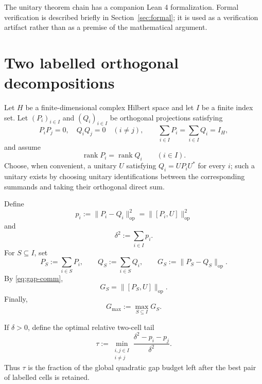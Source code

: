 \documentclass[11pt]{article}
\newcommand{\op}{\mathrm{op}}
\newcommand{\gmax}{G_{\max}}
\newcommand{\dd}{\delta}
\begin{document}
The unitary theorem chain has a companion Lean 4 formalization.  Formal
verification is described briefly in Section~\ref{sec:formal}; it is used as
a verification artifact rather than as a premise of the mathematical
argument.


\section{Two labelled orthogonal decompositions}\label{sec:setup}

Let $H$ be a finite-dimensional complex Hilbert space and let $I$ be a finite
index set.  Let $(P_i)_{i\in I}$ and $(Q_i)_{i\in I}$ be orthogonal
projections satisfying
\begin{equation}\label{eq:decomp}
  P_iP_j=0,\quad Q_iQ_j=0\quad(i\ne j),
  \qquad
  \sum_{i\in I}P_i=\sum_{i\in I}Q_i=I_H,
\end{equation}
and assume
\[
  \operatorname{rank}P_i=\operatorname{rank}Q_i
  \qquad(i\in I).
\]
Choose, when convenient, a unitary $U$ satisfying $Q_i=UP_iU^*$ for every
$i$; such a unitary exists by choosing unitary identifications between the
corresponding summands and taking their orthogonal direct sum.

Define
\begin{equation}\label{eq:pi}
  p_i:=\|P_i-Q_i\|_{\op}^2
      =\|[P_i,U]\|_{\op}^2
\end{equation}
and
\begin{equation}\label{eq:delta}
  \dd^2:=\sum_{i\in I}p_i.
\end{equation}
For $S\subseteq I$, set
\begin{equation}\label{eq:cut}
  P_S:=\sum_{i\in S}P_i,\qquad
  Q_S:=\sum_{i\in S}Q_i,\qquad
  G_S:=\|P_S-Q_S\|_{\op}.
\end{equation}
By \eqref{eq:gap-comm},
\[
  G_S=\|[P_S,U]\|_{\op}.
\]
Finally,
\[
  \gmax:=\max_{S\subseteq I}G_S.
\]

If $\dd>0$, define the optimal relative two-cell tail
\begin{equation}\label{eq:tau}
  \tau:=
  \min_{\substack{i,j\in I\\i\ne j}}
  \frac{\dd^2-p_i-p_j}{\dd^2}.
\end{equation}
Thus $\tau$ is the fraction of the global quadratic gap budget left after the
best pair of labelled cells is retained.
\end{document}
